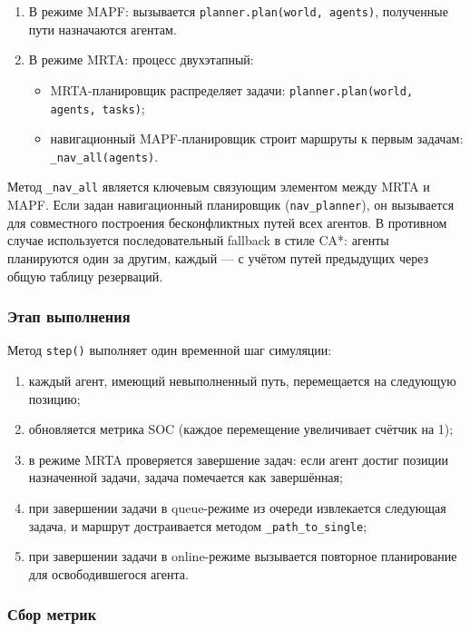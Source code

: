 \begin{enumerate}[arabic]
    \item В режиме MAPF: вызывается \texttt{planner.plan(world, agents)}, полученные пути назначаются агентам.
    \item В режиме MRTA: процесс двухэтапный:
    \begin{itemize}
        \item MRTA-планировщик распределяет задачи: \texttt{planner.plan(world, agents, tasks)};
        \item навигационный MAPF-планировщик строит маршруты к первым задачам: \texttt{\_nav\_all(agents)}.
    \end{itemize}
\end{enumerate}

Метод \texttt{\_nav\_all} является ключевым связующим элементом между MRTA и MAPF. Если задан навигационный планировщик (\texttt{nav\_planner}), он вызывается для совместного построения бесконфликтных путей всех агентов. В противном случае используется последовательный fallback в стиле CA*: агенты планируются один за другим, каждый --- с учётом путей предыдущих через общую таблицу резерваций.

\subsubsection{Этап выполнения}

Метод \texttt{step()} выполняет один временной шаг симуляции:

\begin{enumerate}[arabic]
    \item каждый агент, имеющий невыполненный путь, перемещается на следующую позицию;
    \item обновляется метрика SOC (каждое перемещение увеличивает счётчик на 1);
    \item в режиме MRTA проверяется завершение задач: если агент достиг позиции назначенной задачи, задача помечается как завершённая;
    \item при завершении задачи в queue-режиме из очереди извлекается следующая задача, и маршрут достраивается методом \texttt{\_path\_to\_single};
    \item при завершении задачи в online-режиме вызывается повторное планирование для освободившегося агента.
\end{enumerate}

\subsubsection{Сбор метрик}

